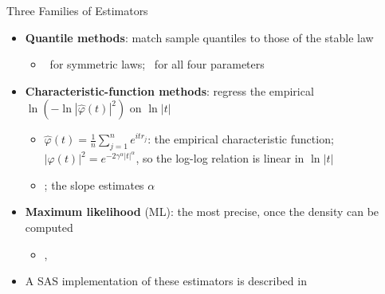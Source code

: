 \begin{frame}{Three Families of Estimators}
\itemsize{\small}
\begin{itemize}
    \item \textbf{Quantile methods}: match sample quantiles to those of the stable law
    \begin{itemize}
        \item {}\ for symmetric laws; \ for all four parameters
    \end{itemize}
    \item \textbf{Characteristic-function methods}: regress the empirical $\ln(-\ln|\hat\varphi(t)|^2)$ on $\ln|t|$
    \begin{itemize}
        \item $\hat\varphi(t) = \frac1n\sum_{j=1}^n e^{itr_j}$: the empirical characteristic function; $|\varphi(t)|^2 = e^{-2\gamma^\alpha|t|^\alpha}$, so the log-log relation is linear in $\ln|t|$
        \item {}; the slope estimates $\alpha$
    \end{itemize}
    \item \textbf{Maximum likelihood} (ML): the most precise, once the density can be computed
    \begin{itemize}
        \item {}, 
    \end{itemize}
    \item A SAS implementation of these estimators is described in 
\end{itemize}
\end{frame}

